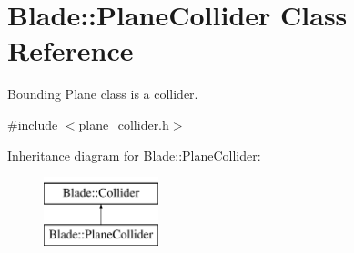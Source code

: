 \hypertarget{class_blade_1_1_plane_collider}{}\section{Blade\+:\+:Plane\+Collider Class Reference}
\label{class_blade_1_1_plane_collider}


Bounding Plane class is a collider.  




{\ttfamily \#include $<$plane\+\_\+collider.\+h$>$}

Inheritance diagram for Blade\+:\+:Plane\+Collider\+:\begin{figure}[H]
\begin{center}
\leavevmode
\includegraphics[height=2.000000cm]{class_blade_1_1_plane_collider}
\end{center}
\end{figure}
